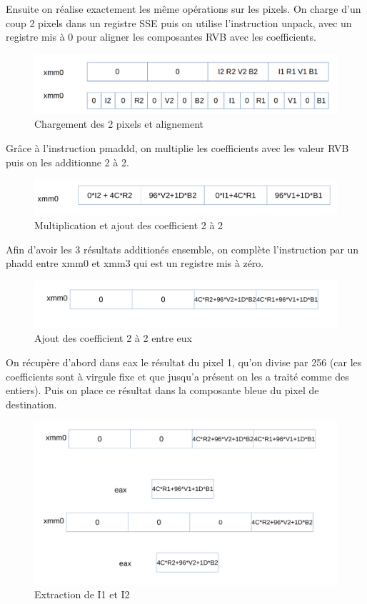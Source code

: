 \documentclass[11pt]{report}
\begin{document}
Ensuite on réalise exactement les même opérations sur les pixels. On charge d'un coup 2 pixels dans un registre SSE puis on utilise l'instruction unpack, avec un registre mis à 0 pour aligner les composantes RVB avec les coefficients. 
\begin{figure}[htp]
\centering
\includegraphics[scale=0.2]{chargement_pixel.png}
\caption{Chargement des 2 pixels et alignement}
\label{}
\end{figure}

\newpage


Grâce à l'instruction pmaddd, on multiplie les coefficients avec les valeur RVB puis on les additionne 2 à 2.

\begin{figure}[htp]
\centering
\includegraphics[scale=0.20]{pmadd.png}
\caption{Multiplication et ajout des coefficient 2 à 2}
\label{}
\end{figure}

Afin d'avoir les 3 résultats additionés ensemble, on complète l'instruction par un phadd entre xmm0 et xmm3 qui est un registre mis à zéro. 
\begin{figure}[htp]
\centering
\includegraphics[scale=0.20]{phadd.png}
\caption{Ajout des coefficient 2 à 2 entre eux}
\label{}
\end{figure}

On récupère d'abord dans eax le résultat du pixel 1, qu'on divise par 256 (car les coefficients sont à virgule fixe et que jusqu'a présent on les a traité comme des entiers). Puis on place ce résultat dans la composante bleue du pixel de destination.


\begin{figure}[htp]
\centering
\includegraphics[scale=0.2]{extraction.png}
\caption{Extraction de I1 et I2}
\label{}
\end{figure}
\end{document}
